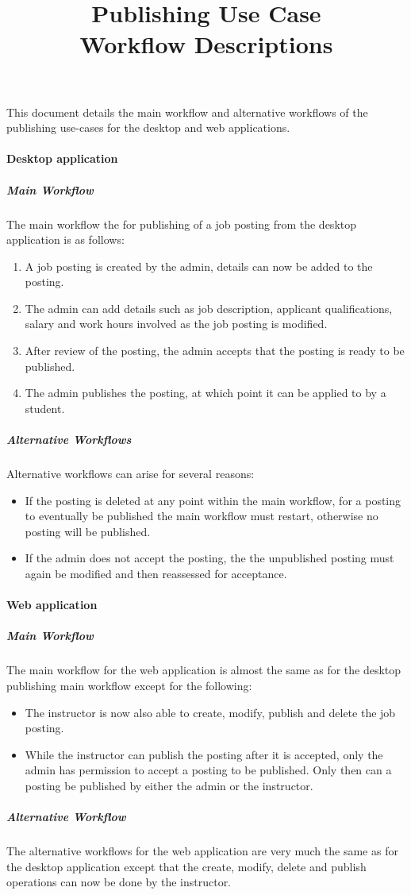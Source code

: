 \documentclass[12pt]{article}
\title{Publishing Use Case \\ Workflow Descriptions}
\date{}
\begin{document}
	\maketitle
		This document details the main workflow and alternative workflows of the publishing use-cases for the desktop and web applications.
	\paragraph {Desktop application}
		\subparagraph{Main Workflow\\}
			The main workflow the for publishing of a job posting from the desktop application is as follows:
			\begin{enumerate}
				\item A job posting is created by the admin, details can now be added to the posting.
				\item The admin can add details such as job description, applicant qualifications, salary and work hours involved as the job posting is modified.
				\item After review of the posting, the admin accepts that the posting is ready to be published.
				\item The admin publishes the posting, at which point it can be applied to by a student.
			\end{enumerate}
		\subparagraph{Alternative Workflows\\}
			Alternative workflows can arise for several reasons:
			\begin{itemize}
				\item If the posting is deleted at any point within the main workflow, for a posting to eventually be published the main workflow must restart, otherwise no posting will be published.
				\item If the admin does not accept the posting, the the unpublished posting must again be modified and then reassessed for acceptance.
			\end{itemize}

	\paragraph{Web application}
		\subparagraph{Main Workflow\\}
			The main workflow for the web application is almost the same as for the desktop publishing main workflow except for the following:
			\begin{itemize}
				\item The instructor is now also able to create, modify, publish and delete the job posting.
				\item While the instructor can publish the posting after it is accepted, only the admin has permission to accept a posting to be published. Only then can a posting be published by either the admin or the instructor. 
			\end{itemize}
				
		\subparagraph{Alternative Workflow\\}
			The alternative workflows for the web application are very much the same as for the desktop application except that the create, modify, delete and publish operations can now be done by the instructor.

			
\end{document}
